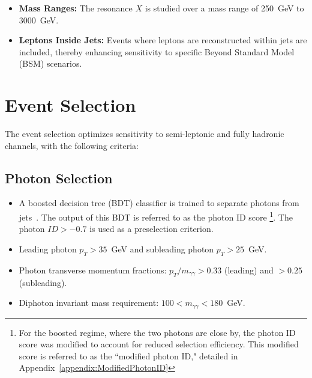 \begin{itemize}
    \item \textbf{Mass Ranges:}
    The resonance \(X\) is studied over a mass range of 250~GeV to 3000~GeV.

    \item \textbf{Leptons Inside Jets:}
    Events where leptons are reconstructed within jets are included, thereby enhancing sensitivity to specific Beyond Standard Model (BSM) scenarios.
\end{itemize}

\section{Event Selection}


The event selection optimizes sensitivity to semi-leptonic and fully hadronic channels, with the following criteria:

\subsection*{Photon Selection}
\begin{itemize}
    \item A boosted decision tree (BDT) classifier is trained to separate photons from jets~\cite{Sirunyan:2018ouh}.
            The output of this BDT is referred to as the photon ID score
            \footnote{For the boosted regime, where the two photons are close by, the photon ID score was modified to
            account for reduced selection efficiency.
            This modified score is referred to as the ``modified photon ID," detailed in
            Appendix~\ref{appendix:ModifiedPhotonID}}. The photon $ID > -0.7$ is used as a preselection criterion.
    \item Leading photon \(p_T > 35\)~GeV and subleading photon \(p_T > 25\)~GeV.
    \item Photon transverse momentum fractions: \(p_T/m_{\gamma\gamma} > 0.33\) (leading) and \(> 0.25\) (subleading).
    \item Diphoton invariant mass requirement: \(100 < m_{\gamma\gamma} < 180\)~GeV.
\end{itemize}


